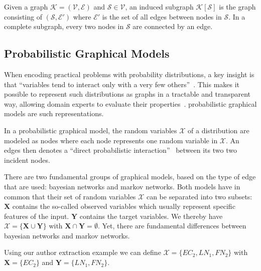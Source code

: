 Given a \gls{graph} $\mathcal{K} = (\mathcal{V},\mathcal{E})$ and $\mathcal{S}\in\mathcal{V}$, an induced \gls{subgraph} $\mathcal{K}[\mathcal{S}]$ is the \gls{graph} consisting of $(\mathcal{S},\mathcal{E'})$ where $\mathcal{E'}$ is the set of all \glspl{edge} between \glspl{node} in $\mathcal{S}$.
In a complete \gls{subgraph}, every two \glspl{node} in $\mathcal{S}$ are connected by an \gls{edge}.

\subsection{Probabilistic Graphical Models}\label{subsec:graphical-models}
When encoding practical problems with \glspl{probability distribution}, a key insight is that ``variables tend to interact only with a very few others''~\citep{koller2009probabilistic}.
This makes it possible to represent such distributions as graphs in a tractable and transparent way, allowing domain experts to evaluate their properties~\citep{koller2009probabilistic}.
\Glspl{probabilistic graphical model} are such representations.

\bigskip

In a \gls{probabilistic graphical model}, the \glspl{random variable} $\mathcal{X}$ of a distribution are modeled as \glspl{node} where each \gls{node} represents one \gls{random variable} in $\mathcal{X}$. An \glspl{edge} then denotes a ``direct probabilistic interaction''~\citep{koller2009probabilistic} between its two two incident \glspl{node}.

There are two fundamental groups of graphical models, based on the type of edge that are used: \glspl{bayesian network} and \glspl{markov network}.
Both models have in common that their set of \glspl{random variable} $\mathcal{X}$ can be separated into two subsets:
$\mathbf{X}$ contains the so-called \glspl{observed variable} which usually represent specific features of the input.
$\mathbf{Y}$ contains the \glspl{target variable}.
We thereby have $\mathcal{X}=\{\mathbf{X}\cup\mathbf{Y}\}$ with $\mathbf{X}\cap\mathbf{Y}=\emptyset$.
Yet, there are fundamental differences between \glspl{bayesian network} and \glspl{markov network}.

Using our author extraction example we can define $\mathcal{X}=\{EC_2,LN_1,FN_2\}$ with $\mathbf{X}=\{EC_2\}$ and $\mathbf{Y}=\{LN_1,FN_2\}$.

\bigskip


